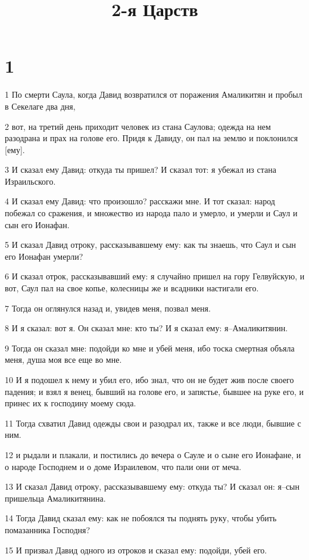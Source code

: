 

\title{2-я Царств}


\chapter{1}

\par 1 По смерти Саула, когда Давид возвратился от поражения Амаликитян и пробыл в Секелаге два дня,
\par 2 вот, на третий день приходит человек из стана Саулова; одежда на нем разодрана и прах на голове его. Придя к Давиду, он пал на землю и поклонился [ему].
\par 3 И сказал ему Давид: откуда ты пришел? И сказал тот: я убежал из стана Израильского.
\par 4 И сказал ему Давид: что произошло? расскажи мне. И тот сказал: народ побежал со сражения, и множество из народа пало и умерло, и умерли и Саул и сын его Ионафан.
\par 5 И сказал Давид отроку, рассказывавшему ему: как ты знаешь, что Саул и сын его Ионафан умерли?
\par 6 И сказал отрок, рассказывавший ему: я случайно пришел на гору Гелвуйскую, и вот, Саул пал на свое копье, колесницы же и всадники настигали его.
\par 7 Тогда он оглянулся назад и, увидев меня, позвал меня.
\par 8 И я сказал: вот я. Он сказал мне: кто ты? И я сказал ему: я--Амаликитянин.
\par 9 Тогда он сказал мне: подойди ко мне и убей меня, ибо тоска смертная объяла меня, душа моя все еще во мне.
\par 10 И я подошел к нему и убил его, ибо знал, что он не будет жив после своего падения; и взял я венец, бывший на голове его, и запястье, бывшее на руке его, и принес их к господину моему сюда.
\par 11 Тогда схватил Давид одежды свои и разодрал их, также и все люди, бывшие с ним.
\par 12 и рыдали и плакали, и постились до вечера о Сауле и о сыне его Ионафане, и о народе Господнем и о доме Израилевом, что пали они от меча.
\par 13 И сказал Давид отроку, рассказывавшему ему: откуда ты? И сказал он: я--сын пришельца Амаликитянина.
\par 14 Тогда Давид сказал ему: как не побоялся ты поднять руку, чтобы убить помазанника Господня?
\par 15 И призвал Давид одного из отроков и сказал ему: подойди, убей его.
